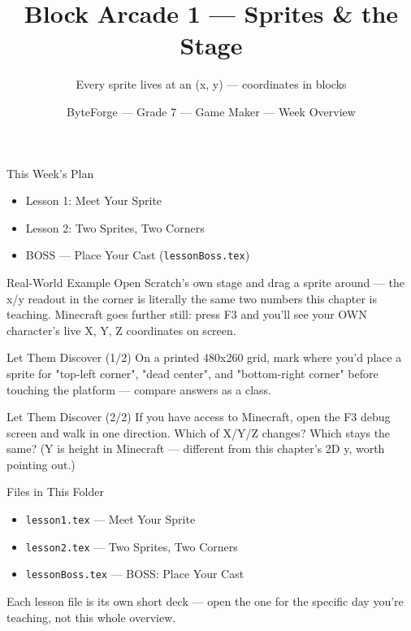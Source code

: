 \documentclass[aspectratio=169]{beamer}
\title{Block Arcade 1 — Sprites \& the Stage}
\subtitle{Every sprite lives at an (x, y) — coordinates in blocks}
\author{ByteForge --- Grade 7 --- Game Maker --- Week Overview}
\date{}
\begin{document}
\begin{frame}
    \titlepage
\end{frame}

\begin{frame}{This Week's Plan}
    \begin{itemize}
        \item Lesson 1: Meet Your Sprite
        \item Lesson 2: Two Sprites, Two Corners
        \item[$\bigstar$] BOSS --- Place Your Cast (\texttt{lessonBoss.tex})
    \end{itemize}
\end{frame}

\begin{frame}{Real-World Example}
    \Large
    Open Scratch's own stage and drag a sprite around — the x/y readout in the corner is literally the same two numbers this chapter is teaching. Minecraft goes further still: press F3 and you'll see your OWN character's live X, Y, Z coordinates on screen.
\end{frame}


\begin{frame}{Let Them Discover (1/2)}
    \Large
    On a printed 480x260 grid, mark where you'd place a sprite for "top-left corner", "dead center", and "bottom-right corner" before touching the platform — compare answers as a class.
\end{frame}


\begin{frame}{Let Them Discover (2/2)}
    \Large
    If you have access to Minecraft, open the F3 debug screen and walk in one direction. Which of X/Y/Z changes? Which stays the same? (Y is height in Minecraft — different from this chapter's 2D y, worth pointing out.)
\end{frame}

\begin{frame}{Files in This Folder}
    \small
    \begin{itemize}
        \item \texttt{lesson1.tex} --- Meet Your Sprite
        \item \texttt{lesson2.tex} --- Two Sprites, Two Corners
        \item \texttt{lessonBoss.tex} --- BOSS: Place Your Cast
    \end{itemize}
    \vspace{0.5em}
    \normalsize Each lesson file is its own short deck --- open the one for
    the specific day you're teaching, not this whole overview.
\end{frame}
\end{document}
